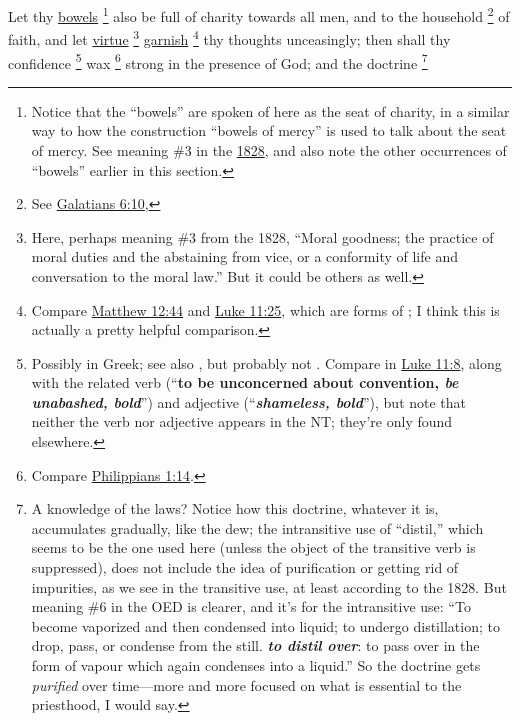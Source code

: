 		Let thy \hyperref[BOWELS]{bowels}%
			\footnote{%
				Notice that the ``bowels'' are spoken of here as the seat of charity, in a similar way to how the construction ``bowels of mercy'' is used to talk about the seat of mercy. See meaning \#3 in the \hyperref[BOWELS-1828]{1828}, and also note the other occurrences of ``bowels'' earlier in this section.
				}
		also be full of charity towards all men, and to the household%
			\footnote{%
				See \hyperref[GALATIANS-6-10]{Galatians 6:10},
				}
		of faith, and let \hyperref[VIRTUE]{virtue}%
			\footnote{%
				Here, perhaps meaning \#3 from the 1828, ``Moral goodness; the practice of moral duties and the abstaining from vice, or a conformity of life and conversation to the moral law.'' But it could be others as well.
				}
		\hyperref[GARNISH]{garnish}%
			\footnote{%
				Compare \hyperref[MATTHEW-12-44]{Matthew 12:44} and \hyperref[LUKE-11-25]{Luke 11:25}, which are forms of ; I think this is actually a pretty helpful comparison.
				}
		thy thoughts unceasingly; then shall thy confidence%
			\footnote{%
				Possibly  in Greek; see also , but probably not . Compare  in \hyperref[LUKE-11-8]{Luke 11:8}, along with the related verb  (``\textbf{to be unconcerned about convention, \textit{be unabashed, bold}}'') and adjective  (``\textbf{\textit{shameless, bold}}''), but note that neither the verb nor adjective appears in the NT; they're only found elsewhere.
				}
		wax%
			\footnote{%
				Compare \hyperref[PHILIPPIANS-1-14]{Philippians 1:14}.
				}
		strong in the presence of God; and the doctrine%
			\footnote{%
				A knowledge of the laws? Notice how this doctrine, whatever it is, accumulates gradually, like the dew; the intransitive use of ``distil,'' which seems to be the one used here (unless the object of the transitive verb is suppressed), does not include the idea of purification or getting rid of impurities, as we see in the transitive use, at least according to the 1828. But meaning \#6 in the OED is clearer, and it's for the intransitive use: ``To become vaporized and then condensed into liquid; to undergo distillation; to drop, pass, or condense from the still. \textit{\textbf{to distil over}}: to pass over in the form of vapour which again condenses into a liquid.'' So the doctrine gets \textit{purified} over time---more and more focused on what is essential to the priesthood, I would say.
				}
